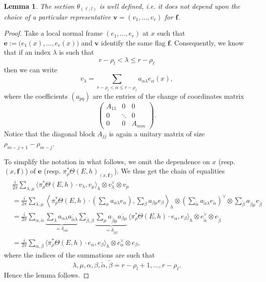 \documentclass[a4paper]{amsart}
\theoremstyle{plain}%
\newtheorem{lemma}[theorem]{Lemma}
\theoremstyle{definition}
\theoremstyle{remark}
\begin{document}
\begin{lemma}\label{lem:blocksgeneral}
	The section $ \theta_{(\ell,l)} $ is well defined, \textsl{i.e.} it does not depend upon the choice of a particular representative $ \mathbf v= (v_1,\dots,v_r) $ for $ \mathbf{f} $.
\end{lemma}
\begin{proof}
	Take a local normal frame $ (e_1,\dots,e_r) $ at $ x $ such that $ \mathbf{e} := \bigl(e_1(x),\dots,e_r(x)\bigr) $ and $ \mathbf{v} $ identify the same flag $ \mathbf{f} $.
	Consequently, we know that if an index $ \lambda $ is such that
	\[
	r-\rho_l < \lambda \le r-\rho_{\ell}
	\]
	then we can write
	\begin{equation*}
		v_\lambda = \sum_{r-\rho_l < \alpha \le r-\rho_{\ell}} a_{\alpha \lambda} e_{\alpha}(x),
	\end{equation*}
	where the coefficients $ (a_{pq}) $ are the entries of the change of coordinates matrix
	\begin{equation*}
		\begin{pmatrix}
			A_{11} & 0 & 0 \\
			0 & \ddots & 0 \\
			0 & 0 & A_{mm}
		\end{pmatrix}.
	\end{equation*}
	Notice that the diagonal block $ A_{jj} $ is again a unitary matrix of size $ \rho_{m-j+1} - \rho_{m-j} $.
	
	To simplify the notation in what follows, we omit the dependence on $ x $ (resp. $ (x,\mathbf{f}) $) of $\mathbf{e}$ (resp. $  \pi_{\rho}^*\Theta(E,h)_{(x,\mathbf{f})} $).
	We thus get the chain of equalities
	\begin{align*}
		& \frac{i}{2\pi} \sum_{\lambda,\mu} \bigl\langle \pi_{\rho}^*\Theta(E,h)\cdot {v_\lambda}, {v_\mu} \bigr\rangle_h \otimes v_{\lambda}^{\vee} \otimes v_{\mu} \\
		&= \frac{i}{2\pi} \sum_{\lambda,\mu} {\left\langle {\pi_{\rho}^*\Theta(E,h)}\cdot \left( \sum_{\alpha} a_{\alpha \lambda} e_\alpha \right), \sum_{\beta} a_{\beta \mu} e_\beta \right\rangle_h} \otimes \left( \sum_{\tilde{\alpha}} a_{\tilde{\alpha} \lambda} e_{\tilde{\alpha}} \right)^{\vee} \otimes \sum_{\tilde{\beta}} a_{\tilde{\beta} \mu} e_{\tilde{\beta}} \\
		&= \frac{i}{2\pi} \sum_{\alpha,\tilde{\alpha}}\underbrace{ \sum_{\lambda} a_{\alpha \lambda} \overline{a_{\tilde{\alpha} \lambda}}}_{=\delta_{\alpha\tilde{\alpha}}} \sum_{\tilde{\beta},\beta}\underbrace{ \sum_{\mu} a_{\tilde{\beta} \mu} \overline{a_{\beta \mu}}}_{=\delta_{\tilde{\beta}\beta}} \,\bigl\langle {\pi_{\rho}^*\Theta(E,h)}\cdot {e_\alpha}, {e_\beta} \bigr\rangle_h \otimes e_{\tilde{\alpha}}^{\vee} \otimes e_{\tilde{\beta}} \\
		&= \frac{i}{2\pi} \sum_{\alpha,\beta}\bigl\langle {\pi_{\rho}^*\Theta(E,h)}\cdot {e_\alpha}, {e_\beta} \bigr\rangle_h \otimes e_{\alpha}^{\vee} \otimes e_{\beta},
	\end{align*}
	where the indices of the summations are such that
	\[
	\lambda,\mu,\alpha,\beta,\tilde{\alpha},\tilde{\beta} = r-\rho_l + 1, \dots, r-\rho_{\ell} .
	\]
	Hence the lemma follows.
\end{proof}
\end{document}
